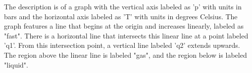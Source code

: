 The description is of a graph with the vertical axis labeled as 'p' with units in bars and the horizontal axis labeled as 'T' with units in degrees Celsius. The graph features a line that begins at the origin and increases linearly, labeled as "fast". There is a horizontal line that intersects this linear line at a point labeled 'q1'. From this intersection point, a vertical line labeled 'q2' extends upwards. The region above the linear line is labeled "gas", and the region below is labeled "liquid".